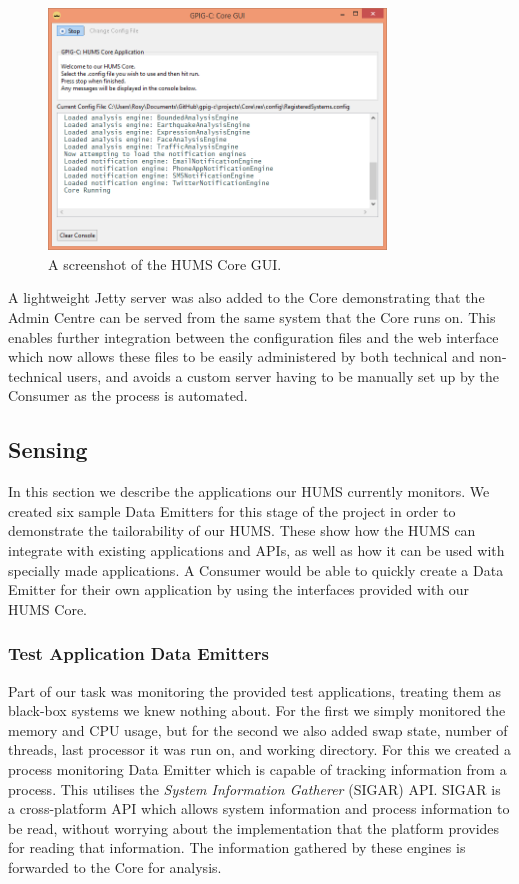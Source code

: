 \documentclass[10pt,a4paper]{article}
\begin{document}
\begin{figure}[ht]
\centering
\includegraphics[width = 0.8\textwidth]{images/coreGUI.png}
\caption{A screenshot of the HUMS Core GUI.}
\label{fig:coreGUI}
\end{figure}

A lightweight Jetty server was also added to the Core demonstrating that the Admin Centre can be served from the same system that the Core runs on. This enables further integration between the configuration files and the web interface which now allows these files to be easily administered by both technical and non-technical users, and avoids a custom server having to be manually set up by the Consumer as the process is automated.

\subsection{Sensing}
\label{sec:monitor}
In this section we describe the applications our HUMS currently monitors. We created six sample Data Emitters for this stage of the project in order to demonstrate the tailorability of our HUMS. These show how the HUMS can integrate with existing applications and APIs, as well as how it can be used with specially made applications. A Consumer would be able to quickly create a Data Emitter for their own application by using the interfaces provided with our HUMS Core.

\subsubsection{Test Application Data Emitters} 
\label{subsec:tapp}
Part of our task was monitoring the provided test applications, treating them as black-box systems we knew nothing about. For the first we simply monitored the memory and CPU usage, but for the second we also added swap state, number of threads, last processor it was run on, and working directory. For this we created a process monitoring Data Emitter which is capable of tracking information from a process. This utilises the \emph{System Information Gatherer} (SIGAR) API. SIGAR is a cross-platform API which allows system information and process information to be read, without worrying about the implementation that the platform provides for reading that information. The information gathered by these engines is forwarded to the Core for analysis.
\end{document}
